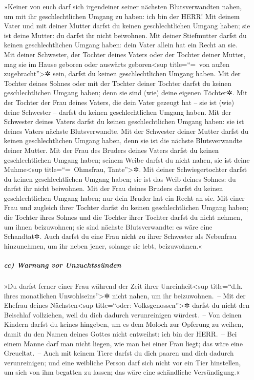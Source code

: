 »Keiner von euch darf sich irgendeiner seiner nächsten
Blutsverwandten nahen, um mit ihr geschlechtlichen Umgang zu haben: ich
bin der HERR! Mit deinem Vater und mit deiner Mutter
darfst du keinen geschlechtlichen Umgang haben; sie ist deine Mutter: du
darfst ihr nicht beiwohnen. Mit deiner Stiefmutter darfst
du keinen geschlechtlichen Umgang haben: dein Vater allein hat ein Recht
an sie. Mit deiner Schwester, der Tochter deines Vaters
oder der Tochter deiner Mutter, mag sie im Hause geboren oder auswärts
geboren\textless sup title=``=~von außen zugebracht''\textgreater✲ sein,
darfst du keinen geschlechtlichen Umgang haben. Mit der
Tochter deines Sohnes oder mit der Tochter deiner Tochter darfst du
keinen geschlechtlichen Umgang haben; denn sie sind (wie) deine eigenen
Töchter✲. Mit der Tochter der Frau deines Vaters, die
dein Vater gezeugt hat -- sie ist (wie) deine Schwester -- darfst du
keinen geschlechtlichen Umgang haben. Mit der Schwester
deines Vaters darfst du keinen geschlechtlichen Umgang haben: sie ist
deines Vaters nächste Blutsverwandte. Mit der Schwester
deiner Mutter darfst du keinen geschlechtlichen Umgang haben, denn sie
ist die nächste Blutsverwandte deiner Mutter. Mit der
Frau des Bruders deines Vaters darfst du keinen geschlechtlichen Umgang
haben; seinem Weibe darfst du nicht nahen, sie ist deine
Muhme\textless sup title=``=~Ohmsfrau, Tante''\textgreater✲.
Mit deiner Schwiegertochter darfst du keinen
geschlechtlichen Umgang haben; sie ist das Weib deines Sohnes: du darfst
ihr nicht beiwohnen. Mit der Frau deines Bruders darfst
du keinen geschlechtlichen Umgang haben; nur dein Bruder hat ein Recht
an sie. Mit einer Frau und zugleich ihrer Tochter darfst
du keinen geschlechtlichen Umgang haben; die Tochter ihres Sohnes und
die Tochter ihrer Tochter darfst du nicht nehmen, um ihnen beizuwohnen;
sie sind nächste Blutsverwandte: es wäre eine Schandtat✲.
Auch darfst du eine Frau nicht zu ihrer Schwester als
Nebenfrau hinzunehmen, um ihr neben jener, solange sie lebt,
beizuwohnen.«

\hypertarget{cc-warnung-vor-unzuchtssuxfcnden}{%
\subparagraph{cc) Warnung vor
Unzuchtssünden}\label{cc-warnung-vor-unzuchtssuxfcnden}}

»Du darfst ferner einer Frau während der Zeit ihrer
Unreinheit\textless sup title=``d.h. ihres monatlichen
Unwohlseins''\textgreater✲ nicht nahen, um ihr beizuwohnen.~--
Mit der Ehefrau deines Nächsten\textless sup
title=``oder: Volksgenossen''\textgreater✲ darfst du nicht den Beischlaf
vollziehen, weil du dich dadurch verunreinigen würdest.~--
Von deinen Kindern darfst du keines hingeben, um es dem
Moloch zur Opferung zu weihen, damit du den Namen deines Gottes nicht
entweihst: ich bin der HERR.~-- Bei einem Manne darf man
nicht liegen, wie man bei einer Frau liegt; das wäre eine Greueltat.~--
Auch mit keinem Tiere darfst du dich paaren und dich
dadurch verunreinigen; und eine weibliche Person darf sich nicht vor ein
Tier hinstellen, um sich von ihm begatten zu lassen; das wäre eine
schändliche Versündigung.«

